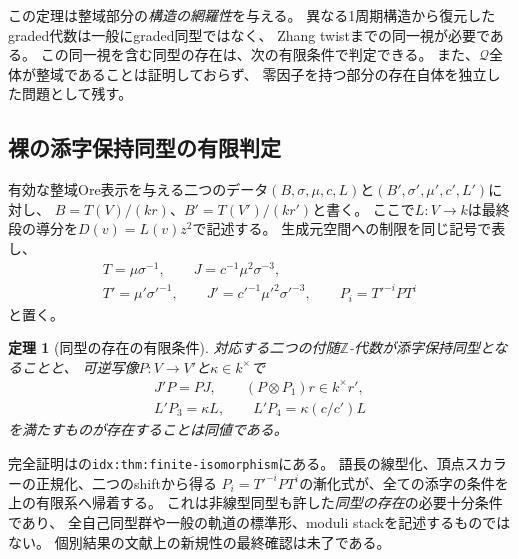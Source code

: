 \documentclass[11pt,a4paper]{ltjsarticle}
\newtheorem{theorem}{定理}[section]
\theoremstyle{definition}
\newcommand{\ZZ}{\mathbb Z}
\begin{document}
この定理は整域部分の\emph{構造の網羅性}を与える。
異なる1周期構造から復元したgraded代数は一般にgraded同型ではなく、
Zhang twistまでの同一視が必要である\cite[Theorem 1.2 = Corollary 4.4]{Sierra}。
この同一視を含む同型の存在は、次の有限条件で判定できる。
また、$\mathcal Q$全体が整域であることは証明しておらず、
零因子を持つ部分の存在自体を独立した問題として残す。

\subsection{裸の添字保持同型の有限判定}
有効な整域Ore表示を与える二つのデータ$(B,\sigma,\mu,c,L)$と$(B',\sigma',\mu',c',L')$に対し、
$B=T(V)/(kr)$、$B'=T(V')/(kr')$と書く。
ここで$L:V\to k$は最終段の導分を$D(v)=L(v)z^2$で記述する。
生成元空間への制限を同じ記号で表し、
\begin{gather*}
T=\mu\sigma^{-1},\qquad J=c^{-1}\mu^2\sigma^{-3},\\
T'=\mu'\sigma'^{-1},\qquad J'=c'^{-1}\mu'^2\sigma'^{-3},\qquad
P_i=T'^{-i}PT^i
\end{gather*}
と置く。
\begin{theorem}[同型の存在の有限条件]\label{thm:finite-isomorphism-summary}
対応する二つの付随$\ZZ$-代数が添字保持同型となることと、
可逆写像$P:V\to V'$と$\kappa\in k^\times$で
\[
\begin{gathered}
J'P=PJ,\qquad(P\otimes P_1)r\in k^\times r',\\
L'P_3=\kappa L,\qquad L'P_4=\kappa(c/c')L
\end{gathered}
\]
を満たすものが存在することは同値である。
\end{theorem}
完全証明はの\texttt{idx:thm:finite-isomorphism}にある。
語長の線型化、頂点スカラーの正規化、二つのshiftから得る
$P_i=T'^{-i}PT^i$の漸化式が、全ての添字の条件を上の有限系へ帰着する。
これは非線型同型も許した\emph{同型の存在}の必要十分条件であり、
全自己同型群や一般の軌道の標準形、moduli stackを記述するものではない。
個別結果の文献上の新規性の最終確認は未了である。
\end{document}
